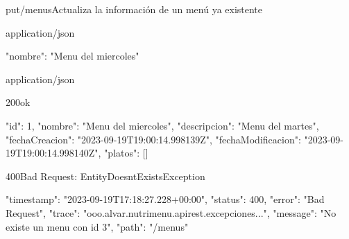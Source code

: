 \begin{apiRoute}{put}{/menus}{Actualiza la información de un menú ya existente}
	\begin{routeParameter}
	\end{routeParameter}
	
	\begin{routeRequest}{application/json}
		\begin{routeRequestBody}
{
	"nombre": "Menu del miercoles"
}
		\end{routeRequestBody}
	\end{routeRequest}
	\begin{routeResponse}{application/json}
		\begin{routeResponseItem}{200}{ok}
			\begin{routeResponseItemBody}
{
	"id": 1,
	"nombre": "Menu del miercoles",
	"descripcion": "Menu del martes",
	"fechaCreacion": "2023-09-19T19:00:14.998139Z",
	"fechaModificacion": "2023-09-19T19:00:14.998140Z",
	"platos": []
}
			\end{routeResponseItemBody}
		\end{routeResponseItem}
		\begin{routeResponseItem}{400}{Bad Request: EntityDoesntExistsException}
			\begin{routeResponseItemBody}
{
    "timestamp": "2023-09-19T17:18:27.228+00:00",
    "status": 400,
    "error": "Bad Request",
    "trace": "ooo.alvar.nutrimenu.apirest.excepciones...",
    "message": "No existe un menu con id 3",
    "path": "/menus"
}
			\end{routeResponseItemBody}
		\end{routeResponseItem}
	\end{routeResponse}
\end{apiRoute}

